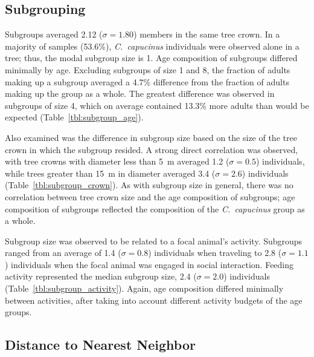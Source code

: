 \documentclass{../../../coursework}
\begin{document}
\subsection{Subgrouping}

Subgroups averaged 2.12 (\(\sigma = 1.80\)) members in the same tree crown. In
a majority of samples (53.6\%), \emph{C.~capucinus} individuals were observed
alone in a tree; thus, the modal subgroup size is 1. Age composition of
subgroups differed minimally by age. Excluding subgroups of size 1 and 8, the
fraction of adults making up a subgroup averaged a 4.7\% difference from the
fraction of adults making up the group as a whole. The greatest difference was
observed in subgroups of size 4, which on average contained 13.3\% more adults
than would be expected (Table~\ref{tbl:subgroup_age}).

Also examined was the difference in subgroup size based on the size of the
tree crown in which the subgroup resided. A strong direct correlation was
observed, with tree crowns with diameter less than \SI{5}{\metre} averaged 1.2
(\(\sigma = 0.5\)) individuals, while trees greater than \SI{15}{\metre} in
diameter averaged 3.4 (\(\sigma = 2.6\)) individuals
(Table~\ref{tbl:subgroup_crown}). As with subgroup size in general, there was
no correlation between tree crown size and the age composition of subgroups;
age composition of subgroups reflected the composition of the
\emph{C.~capucinus} group as a whole.

Subgroup size was observed to be related to a focal animal's activity.
Subgroups ranged from an average of 1.4 (\(\sigma = 0.8\)) individuals when
traveling to 2.8 (\(\sigma = 1.1\)) individuals when the focal animal was
engaged in social interaction. Feeding activity represented the median
subgroup size, 2.4 (\(\sigma = 2.0\)) individuals
(Table~\ref{tbl:subgroup_activity}). Again, age composition differed minimally
between activities, after taking into account different activity budgets of
the age groups.

\subsection{Distance to Nearest Neighbor}
\end{document}
